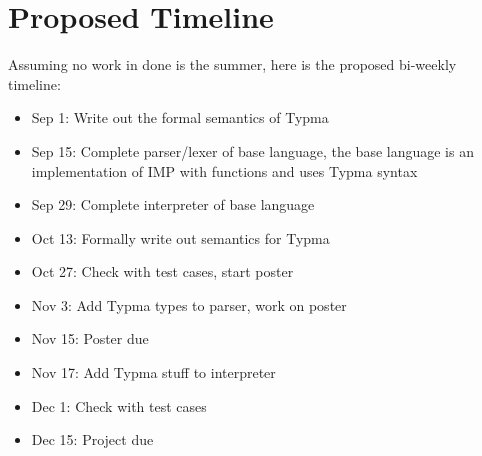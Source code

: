 \documentclass[10pt,twocolumn]{article}
\begin{document}
\section{Proposed Timeline}

Assuming no work in done is the summer, here is the proposed bi-weekly timeline:

\begin{itemize}

\item Sep 1: Write out the formal semantics of Typma

\item Sep 15: Complete parser/lexer of base language, the base language is an implementation of IMP with functions and uses Typma syntax

\item Sep 29: Complete interpreter of base language

\item Oct 13: Formally write out semantics for Typma

\item Oct 27: Check with test cases, start poster

\item Nov 3: Add Typma types to parser, work on poster

\item Nov 15: Poster due

\item Nov 17: Add Typma stuff to interpreter

\item Dec 1: Check with test cases

\item Dec 15: Project due

\end{itemize}

\printbibliography 
\end{document}
